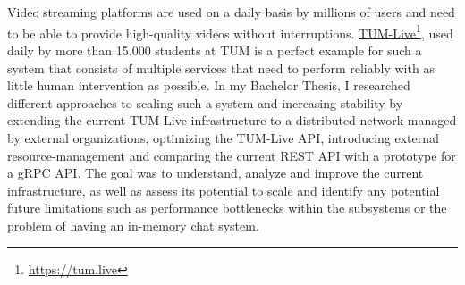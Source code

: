 \chapter{\abstractname}

Video streaming platforms are used on a daily basis by millions of users and need to be able to provide high-quality videos without interruptions. \href{https://tum.live}{TUM-Live}\footnote{\url{https://tum.live}}, used daily by more than 15.000 students at TUM is a perfect example for such a system that consists of multiple services that need to perform reliably with as little human intervention as possible.
In my Bachelor Thesis, I researched different approaches to scaling such a system and increasing stability by extending the current TUM-Live infrastructure to a distributed network managed by external organizations, optimizing the TUM-Live \ac{API}, introducing external resource-management and comparing the current REST \ac{API} with a prototype for a gRPC \ac{API}. The goal was to understand, analyze and improve the current infrastructure, as well as assess its potential to scale and identify any potential future limitations such as performance bottlenecks within the subsystems or the problem of having an in-memory chat system.
